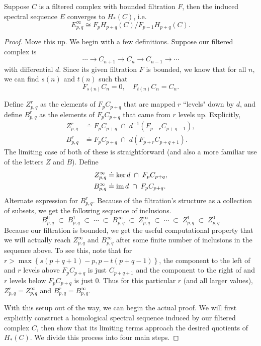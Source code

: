 \documentclass[twoside,10pt]{article}
\begin{document}
\begin{thrm}[]
	\label{thrm:filt-conv}
	Suppose $C$ is a filtered complex with bounded filtration $F$, then the induced spectral sequence $E$ converges to $H_*(C)$, i.e.
\[
	E_{p,q}^{\infty} \cong  F_{p}H_{p+q}(C)/F_{p-1}H_{p+q}(C).
\] 
\end{thrm}
\begin{proof}
	{\color{red}Move this up.} We begin with a few definitions. Suppose our filtered complex is
	\[
	\cdots \to C_{n+1}\to C_{n}\to C_{n-1}\to \cdots
\] with differential $d$. Since its given filtration $F$ is bounded, we know that for all $n$, we can find $s(n)$ and $t(n)$ such that
\[
	F_{s(n)}C_{n}=0, \quad F_{t(n)}C_{n}=C_{n}.
\]

Define $Z_{p,q}^{r}$ as the elements of $F_{p}C_{p+q}$ that are mapped $r$ ``levels" down by $d$, and define $B_{p,q}^{r}$ as the elements of $F_{p}C_{p+q}$ that came from $r$ levels up. Explicitly,
\begin{align*}
	Z_{p,q}^{r} &\doteq F_{p}C_{p+q} \;\cap\; d^{-1}(F_{p-r}C_{p+q-1}),\\
	B_{p,q}^{r} &\doteq F_{p}C_{p+q} \;\cap\; d(F_{p+r}C_{p+q+1}).
\end{align*}
The limiting case of both of these is straightforward (and also a more familiar use of the letters $Z$ and $B$). Define
\begin{align*}
	Z_{p,q}^{\infty} &\doteq \ker d \;\cap\; F_{p}C_{p+q},\\
	B_{p,q}^{\infty} &\doteq \operatorname{im} d \;\cap\; F_{p}C_{p+q}.
\end{align*}
{\color{red}Alternate expression for $B_{p,q}^{r}$.} Because of the filtration's structure as a collection of subsets, we get the following sequence of inclusions.
\[
B_{p,q}^{0}\;\subset \;B_{p,q}^{1}\;\subset \;\cdots\;\subset \;B_{p,q}^{\infty}\;\subset \;Z_{p,q}^{\infty}\;\subset \;\cdots\;\subset \;Z_{p,q}^{1}\;\subset \;Z_{p,q}^{0}
\] 
Because our filtration is bounded, we get the useful computational property that we will actually reach $Z_{p,q}^{\infty}$ and $B_{p,q}^{\infty}$ after some finite number of inclusions in the sequence above. To see this, note that for $r > \max\left\{ s(p+q+1)-p, p-t(p+q-1) \right\}$, the component to the left of and $r$ levels above $F_{p}C_{p+q}$ is just $C_{p+q+1}$ and the component to the right of and $r$ levels below $F_{p}C_{p+q}$ is just 0. Thus for this particular $r$ (and all larger values), $Z_{p,q}^{r}=Z_{p,q}^{\infty}$ and $B_{p,q}^{r}=B_{p,q}^{\infty}$.

With this setup out of the way, we can begin the actual proof. We will first explicitly construct a homological spectral sequence induced by our filtered complex $C$, then show that its limiting terms approach the desired quotients of $H_{*}(C)$. We divide this process into four main steps.


\end{proof}
\end{document}
